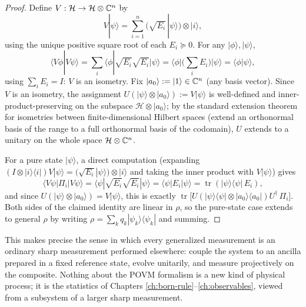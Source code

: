 \begin{proof}
Define $V:\mathcal H \to \mathcal H\otimes\mathbb{C}^n$ by
\begin{equation}
V|\psi\rangle = \sum_{i=1}^n \big(\sqrt{E_i}\,|\psi\rangle\big) \otimes
|i\rangle,
\end{equation}
using the unique positive square root of each $E_i\succeq0$. For any
$|\phi\rangle,|\psi\rangle$,
\begin{equation}
\langle V\phi|V\psi\rangle = \sum_i \langle\phi|\sqrt{E_i}\sqrt{E_i}|\psi
\rangle = \langle\phi|\Big(\sum_i E_i\Big)|\psi\rangle = \langle\phi|\psi
\rangle,
\end{equation}
using $\sum_i E_i = I$: $V$ is an isometry. Fix $|a_0\rangle := |1\rangle \in
\mathbb{C}^n$ (any basis vector). Since $V$ is an isometry, the assignment
$U(|\psi\rangle\otimes|a_0\rangle) := V|\psi\rangle$ is well-defined and
inner-product-preserving on the subspace $\mathcal H\otimes|a_0\rangle$; by
the standard extension theorem for isometries between finite-dimensional
Hilbert spaces (extend an orthonormal basis of the range to a full
orthonormal basis of the codomain), $U$ extends to a unitary on the whole
space $\mathcal H\otimes\mathbb{C}^n$.

For a pure state $|\psi\rangle$, a direct computation (expanding
$(I\otimes|i\rangle\langle i|)V|\psi\rangle = \big(\sqrt{E_i}|\psi\rangle
\big)\otimes|i\rangle$ and taking the inner product with $V|\psi\rangle$)
gives
\begin{equation}
\langle V\psi|\Pi_i|V\psi\rangle = \langle\psi|\sqrt{E_i}\sqrt{E_i}|\psi
\rangle = \langle\psi|E_i|\psi\rangle = \operatorname{tr}(|\psi\rangle\langle
\psi|\,E_i),
\end{equation}
and since $U(|\psi\rangle\otimes|a_0\rangle) = V|\psi\rangle$, this is exactly
$\operatorname{tr}\big[U(|\psi\rangle\langle\psi|\otimes|a_0\rangle\langle
a_0|)U^\dagger\,\Pi_i\big]$. Both sides of the claimed identity are linear in
$\rho$, so the pure-state case extends to general $\rho$ by writing $\rho =
\sum_k q_k|\psi_k\rangle\langle\psi_k|$ and summing.
\end{proof}

\begin{remark}
This makes precise the sense in which every generalized measurement is an
ordinary sharp measurement performed elsewhere: couple the system to an
ancilla prepared in a fixed reference state, evolve unitarily, and measure
projectively on the composite. Nothing about the POVM formalism is a new kind
of physical process; it is the statistics of Chapters
\ref{ch:born-rule}--\ref{ch:observables}, viewed from a subsystem of a larger
sharp measurement.
\end{remark}

